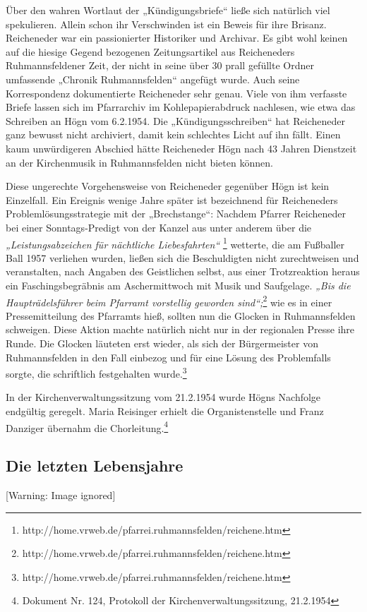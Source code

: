 \documentclass[a4paper]{article}
\newcommand\textstyleZitate[1]{\textit{#1}}
\begin{document}
Über den wahren Wortlaut der „Kündigungsbriefe“ ließe sich natürlich
viel spekulieren. Allein schon ihr Verschwinden ist ein Beweis für ihre
Brisanz. Reicheneder war ein passionierter Historiker und Archivar. Es
gibt wohl keinen auf die hiesige Gegend bezogenen Zeitungsartikel aus
Reicheneders Ruhmannsfeldener Zeit, der nicht in seine über 30 prall
gefüllte Ordner umfassende „Chronik Ruhmannsfelden“ angefügt wurde.
Auch seine Korrespondenz dokumentierte Reicheneder sehr genau. Viele
von ihm verfasste Briefe lassen sich im Pfarrarchiv im
Kohlepapierabdruck nachlesen, wie etwa das Schreiben an Högn vom
6.2.1954. Die „Kündigungsschreiben“ hat Reicheneder ganz bewusst nicht
archiviert, damit kein schlechtes Licht auf ihn fällt. Einen kaum
unwürdigeren Abschied hätte Reicheneder Högn nach 43 Jahren Dienstzeit
an der Kirchenmusik in Ruhmannsfelden nicht bieten können.

Diese ungerechte Vorgehensweise von Reicheneder gegenüber Högn ist kein
Einzelfall. Ein Ereignis wenige Jahre später ist bezeichnend für
Reicheneders Problemlösungsstrategie mit der „Brechstange“: Nachdem
Pfarrer Reicheneder bei einer Sonntags-Predigt von der Kanzel aus unter
anderem über die \textstyleZitate{„Leistungsabzeichen für nächtliche
Liebesfahrten“} \footnote{
http://home.vrweb.de/pfarrei.ruhmannsfelden/reichene.htm} wetterte, die
am Fußballer Ball 1957 verliehen wurden, ließen sich die Beschuldigten
nicht zurechtweisen und veranstalten, nach Angaben des Geistlichen
selbst, aus einer Trotzreaktion heraus ein Faschingsbegräbnis am
Aschermittwoch mit Musik und Saufgelage. \textstyleZitate{„Bis die
Haupträdelsführer beim Pfarramt vorstellig geworden sind“;}\footnote{
http://home.vrweb.de/pfarrei.ruhmannsfelden/reichene.htm} wie es in
einer Pressemitteilung des Pfarramts hieß, sollten nun die Glocken in
Ruhmannsfelden schweigen. Diese Aktion machte natürlich nicht nur in
der regionalen Presse ihre Runde. Die Glocken läuteten erst wieder, als
sich der Bürgermeister von Ruhmannsfelden in den Fall einbezog und für
eine Lösung des Problemfalls sorgte, die schriftlich festgehalten
wurde.\footnote{
http://home.vrweb.de/pfarrei.ruhmannsfelden/reichene.htm}

In der Kirchenverwaltungssitzung vom 21.2.1954 wurde Högns Nachfolge
endgültig geregelt. Maria Reisinger erhielt die Organistenstelle und
Franz Danziger übernahm die Chorleitung.\footnote{ Dokument Nr. 124,
Protokoll der Kirchenverwaltungssitzung, 21.2.1954}

\subsection{Die letzten Lebensjahre}
\hypertarget{RefHeadingToc100333738}{}  [Warning: Image ignored]
 
\end{document}
